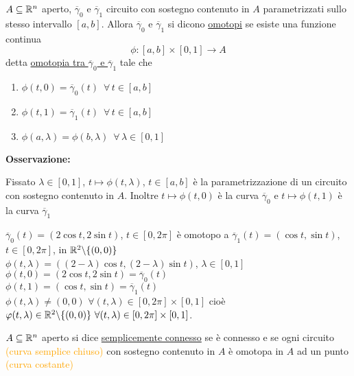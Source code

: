 \begin{definition}
	$A \subseteq \mathbb{R}^n$ aperto, $\overline{\gamma}_0$ e $\overline{\gamma}_1$ circuito con sostegno contenuto in $A$ parametrizzati sullo stesso intervallo $[a,b]$. Allora $\overline{\gamma}_0$ e $\overline{\gamma}_1$ si dicono \underline{omotopi} se esiste una funzione continua 
	\begin{equation*}
		\phi: [a,b]\times [0,1]\rightarrow A
	\end{equation*}
	detta \underline{omotopia tra $\overline{\gamma}_0$ e $\overline{\gamma}_1$} tale che
	\begin{enumerate}
		\item $\phi(t,0)=\overline{\gamma}_0(t)\,\,\, \forall\, t \in [a,b]$
		\item $\phi(t,1)=\overline{\gamma}_1(t)\,\,\, \forall\, t \in [a,b]$
		\item $\phi(a,\lambda)=\phi(b,\lambda)\,\,\, \forall \, \lambda \in[0,1]$
	\end{enumerate}
\end{definition}
	

\textbf{Osservazione:}

Fissato $\lambda \in[0,1]$, $t \mapsto \phi(t,\lambda)$, $t \in [a,b]$ è la parametrizzazione di un circuito con sostegno contenuto  in $A$. Inoltre  $t \mapsto \phi(t,0)$ è la curva $\overline{\gamma}_0$ e $t \mapsto \phi(t,1)$ è la curva $\overline{\gamma}_1$
	
	
\begin{exbar}
\begin{example}
	$\overline{\gamma}_0 (t)=(2\cos t , 2 \sin t)$, $t\in [0,2\pi]$ è omotopo a $\overline{\gamma}_1(t)=(\cos t , \sin t)$, $t \in [0,2\pi]$, in $\mathbb{R}^2\backslash \{(0,0)\}$\\
	$\phi(t,\lambda)=((2-\lambda)\cos t, (2-\lambda)\sin t)$,  $\lambda \in [0,1]$\\
	$\phi (t,0) =(2\cos t, 2 \sin t)=\overline{\gamma}_0 (t)$\\
	$\phi(t,1)=(\cos t , \sin t)=\overline{\gamma}_1(t)$\\
	$\phi(t,\lambda) \neq (0,0) \,\, \forall (t,\lambda)\in [0,2\pi]\times[0,1]$ cioè $\varphi(t,\lambda) \in \mathbb{R}^2 \backslash \{(0,0)\}\,\, \forall (t,\lambda)\in[0,2\pi]\times [0,1]$.
\end{example}
\end{exbar}


\begin{definition}
	$A \subseteq \mathbb{R}^n$ aperto si dice \underline{semplicemente connesso} se è connesso e se ogni circuito  \textcolor{orange}{(curva semplice chiuso)} con sostegno contenuto in $A$ è omotopa in $A$ ad un punto \textcolor{orange}{(curva costante)}
\end{definition}
	
